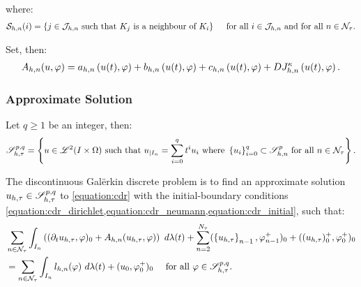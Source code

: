 where:
\begin{gather} %
    \NeighboursTime{i} = \left\{ j \in \SpaceTimeIndices \text{ such that } K_j \text{ is a neighbour of } K_i \right\} \quad \text{ for all } i \in \SpaceTimeIndices \text{ and for all } n \in \TimeIndices.
\end{gather}

Set, then:
\begin{gather}
    A_{h, n}(u, \varphi) = a_{h, n} \left( u(t), \varphi \right) + b_{h, n} \left( u(t), \varphi \right) + c_{h, n} \left( u(t), \varphi \right) + D J^{\kappa}_{h, n} \left( u(t), \varphi \right) \label{equation:cdr_Ahn}.
\end{gather}

\newpage
\subsubsection{Approximate Solution}

\begin{definition}[$\SpaceSolutionFull$]
    Let $q \geq 1$ be an integer, then:
    \begin{gather} %
        \SpaceSolutionFull = \left\{ u \in \SpaceLp{2}(I \times \Omega) \text{ such that } u_{\mid I_n} = \sum_{i = 0}^q t^i u_i \text{ where } \left\{ u_i \right\}_{i = 0}^q \subset \SpaceSolution_{h, n}^p \text{ for all } n \in \TimeIndices \right\}.
    \end{gather}
\end{definition}

The discontinuous Galërkin discrete problem is to find an approximate solution $u_{h, \tau} \in \mathscr{S}^{p, q}_{h, \tau}$ to \cref{equation:cdr} with the initial-boundary conditions \cref{equation:cdr_dirichlet,equation:cdr_neumann,equation:cdr_initial}, such that:
\begin{align} %
    &\sum_{n \in \TimeIndices} \int_{I_n} \left( (\partial_t u_{h, \tau}, \varphi )_0 + A_{h, n}(u_{h, \tau}, \varphi) \right) ~ d \lambda(t) \notag + \sum_{n = 2}^{\nTimeIndices} (\left\{ u_{h, \tau} \right\}_{n - 1}, \varphi_{n - 1}^+ )_0 + ((u_{h, \tau})_0^+, \varphi_0^+ )_0 \notag \\
    &= \sum_{n \in \TimeIndices} \int_{I_n} l_{h, n}(\varphi) ~ d \lambda(t) + (u_0, \varphi_0^+ )_0 \quad \text{ for all } \varphi \in \SpaceSolutionFull. \label{equation:cdr_discrete}
\end{align}

